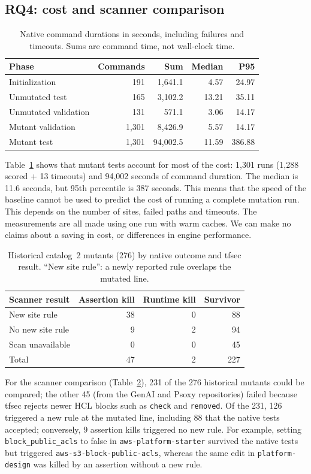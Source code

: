 \documentclass[3p,times,procedia]{elsarticle}
\newcommand{\code}[1]{\texttt{#1}}
\begin{document}
\subsection{RQ4: cost and scanner comparison}\label{sec:costs}
\begin{table}[ht]
\caption{Native command durations in seconds, including failures and timeouts. Sums are command time, not wall-clock time.}\label{tab:costs}
\small\begin{tabularx}{\linewidth}{@{}Xrrrr@{}}\toprule
Phase & Commands & Sum & Median & P95\\\midrule
Initialization & 191 & 1,641.1 & 4.57 & 24.97\\
Unmutated test & 165 & 3,102.2 & 13.21 & 35.11\\
Unmutated validation & 131 & 571.1 & 3.06 & 14.17\\
Mutant validation & 1,301 & 8,426.9 & 5.57 & 14.17\\
Mutant test & 1,301 & 94,002.5 & 11.59 & 386.88\\\bottomrule
\end{tabularx}\end{table}
Table~\ref{tab:costs} shows that mutant tests account for most of the cost: 1,301 runs (1,288 scored + 13 timeouts) and 94,002 seconds of command duration. The median is 11.6 seconds, but 95th percentile is 387 seconds. This means that the speed of the baseline cannot be used to predict the cost of running a complete mutation run. This depends on the number of sites, failed paths and timeouts. The measurements are all made using one run with warm caches. We can make no claims about a saving in cost, or differences in engine performance.

\begin{table}[ht]
\caption{Historical catalog~2 mutants (276) by native outcome and tfsec result. ``New site rule'': a newly reported rule overlaps the mutated line.}\label{tab:scanner}
\small\begin{tabularx}{\linewidth}{@{}Xrrr@{}}\toprule
Scanner result & Assertion kill & Runtime kill & Survivor\\\midrule
New site rule & 38 & 0 & 88\\
No new site rule & 9 & 2 & 94\\
Scan unavailable & 0 & 0 & 45\\\midrule
Total & 47 & 2 & 227\\\bottomrule
\end{tabularx}\end{table}
For the scanner comparison (Table~\ref{tab:scanner}), 231 of the 276 historical mutants could be compared; the other 45 (from the GenAI and Psoxy repositories) failed because tfsec rejects newer HCL blocks such as \code{check} and \code{removed}. Of the 231, 126 triggered a new rule at the mutated line, including 88 that the native tests accepted; conversely, 9 assertion kills triggered no new rule. For example, setting \code{block\_public\_acls} to false in \code{aws-platform-starter} survived the native tests but triggered \code{aws-s3-block-public-acls}, whereas the same edit in \code{platform-design} was killed by an assertion without a new rule.
\end{document}
